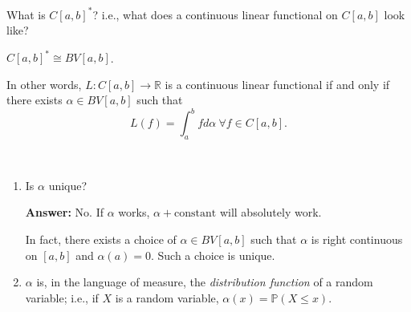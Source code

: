 \documentclass[letterpaper, reqno,11pt]{article}
\newcommand{\RR}{\mathbb{R}}
\begin{document}
 What is $C[a, b]^*$? i.e., what does a continuous linear functional on $C[a, b]$ look like?

\begin{thm}
  \normalfont $C[a, b]^* \cong BV[a, b]$.

  In other words, $L : C[a, b] \to \RR$ is a continuous linear functional if and only if there exists $\alpha \in BV[a, b]$ such that
  $$ L(f) = \int_a^b fd\alpha ~ \forall f \in C[a, b]. $$
\end{thm}

\begin{remark}
  \normalfont ~
  
  \begin{enumerate}
  \item Is $\alpha$ unique?
    
    {\bf Answer:} No. If $\alpha$ works, $\alpha + \text{constant}$ will absolutely work.

    In fact, there exists a choice of $\alpha \in BV[a, b]$ such that $\alpha$ is right continuous on $[a, b]$ and $\alpha(a) = 0$. Such a choice is unique.
  \item $\alpha$ is, in the language of measure, the \emph{distribution function} of a random variable; i.e., if $X$ is a random variable, $\alpha(x) = \mathbb P(X \leq x)$.
  \end{enumerate}
\end{remark}
\end{document}
